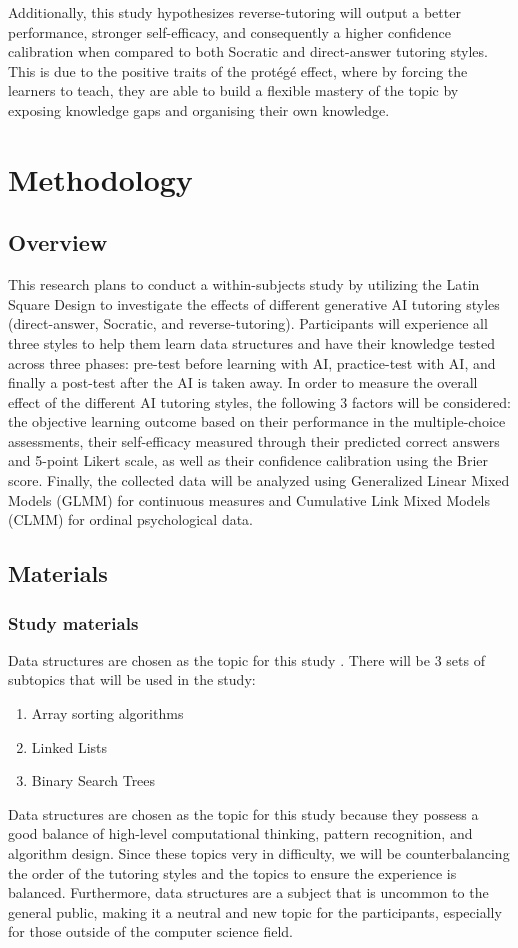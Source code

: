 \documentclass{article}
\begin{document}
Additionally, this study hypothesizes reverse-tutoring will output a better 
performance, stronger self-efficacy, and consequently a higher confidence calibration when 
compared to both Socratic and direct-answer tutoring styles. This is due to the 
positive traits of the protégé effect, where by forcing the learners to teach, they 
are able to build a flexible mastery of the topic by exposing knowledge gaps and 
organising their own knowledge.

\section{Methodology}
\label{sec:methodology}

\subsection{Overview}
This research plans to conduct a within-subjects study by utilizing 
the Latin Square Design to investigate the effects of 
different generative AI tutoring styles (direct-answer, Socratic, and reverse-tutoring). 
Participants will experience all three styles to help them learn 
data structures and have their knowledge tested across three phases: 
pre-test before learning with AI, practice-test with AI, and finally a 
post-test after the AI is taken away. In order to measure the overall 
effect of the different AI tutoring styles, the following 3 factors 
will be considered: the objective learning outcome based on their performance 
in the multiple-choice assessments, their self-efficacy measured through 
their predicted correct answers and 5-point Likert scale, as well as 
their confidence calibration using the Brier score. Finally, the collected 
data will be analyzed using Generalized Linear Mixed Models (GLMM) for continuous measures 
and Cumulative Link Mixed Models (CLMM) for ordinal psychological data.


\subsection{Materials}
\subsubsection{Study materials}
Data structures are chosen as the topic for this study \cite{Kazemitabaar2025}. 
There will be 3 sets of subtopics that will be used in the study:
\begin{enumerate}
    \item Array sorting algorithms
    \item Linked Lists
    \item Binary Search Trees
\end{enumerate}
Data structures are chosen as the topic for this study because they possess 
a good balance of high-level computational thinking, pattern recognition, and 
algorithm design. Since these topics very in difficulty, we will be counterbalancing 
the order of the tutoring styles and the topics to ensure the experience is balanced.
Furthermore, data structures are a subject that is uncommon to 
the general public, making it a neutral and new topic for the participants, especially 
for those outside of the computer science field.
\end{document}
